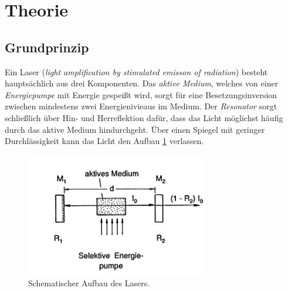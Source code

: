 \section{Theorie}
\label{sec:Theorie}

\subsection{Grundprinzip}
Ein Laser (\textit{light amplification by stimulated emisson of radiation}) besteht hauptsächlich aus drei Komponenten.
Das \textit{aktive Medium}, welches von einer \textit{Energiepumpe} mit Energie gespeißt wird, sorgt für eine Besetzungsinversion zwischen mindestens zwei Energienivieaus im Medium. Der \textit{Resonator} sorgt schließlich über Hin- und Herreflektion dafür, dass das Licht möglichst häufig durch das aktive Medium hindurchgeht. Über einen Spiegel mit geringer Durchlässigkeit kann das Licht den Aufbau \ref{fig:auf} verlassen.

\begin{figure}
    \centering
    \includegraphics[width=8cm]{Bilder/Aufbau.PNG}
    \caption{Schematischer Aufbau des Lasers.\cite{Laserspektroskopie_1}}
    \label{fig:auf}
\end{figure}

